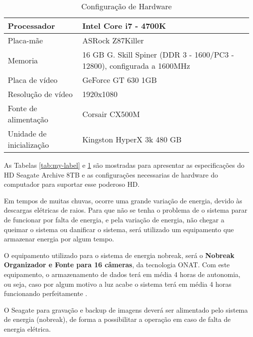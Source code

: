 \begin{table}[htp]
\centering
\caption{Configuração de Hardware}
\begin{tabular}{|p{5cm}|p{10cm}|}
\hline
Processador              & Intel Core i7 - 4700K                                                   \\ \hline
Placa-mãe                & ASRock Z87Killer                                                        \\ \hline
Memoria                  & 16 GB G. Skill Spiner (DDR 3 - 1600/PC3 - 12800), configurada a 1600MHz \\ \hline
Placa de vídeo           & GeForce GT 630 1GB                                                      \\ \hline
Resolução de vídeo       & 1920x1080                                                               \\ \hline
Fonte de alimentação     & Corsair CX500M                                                          \\ \hline
Unidade de inicialização & Kingston HyperX 3k 480 GB                                               \\ \hline
\end{tabular}
\label{tab:configHardware}
\end{table}

As Tabelas \ref{tab:my-label} e \ref{tab:configHardware} são mostradas para apresentar as especificações do HD Seagate Archive 8TB e as configurações necessarias de hardware do computador para suportar esse poderoso HD.

Em tempos de muitas chuvas, ocorre uma grande variação de energia, devido às descargas
elétricas de raios. Para que não se tenha o problema de o sistema parar de funcionar por falta de
energia, e pela variação de energia, não chegar a queimar o sistema ou danificar o sistema,
será utilizado um equipamento que armazenar energia por algum tempo.

O equipamento utilizado para o sistema de energia nobreak, será o \textbf{Nobreak Organizador e
Fonte para 16 câmeras}, da tecnologia ONAT. Com este equipamento, o armazenamento de
dados terá em média 4 horas de autonomia, ou seja, caso por algum motivo a luz acabe o
sistema terá em média 4 horas funcionando perfeitamente \cite{nobreak}.

O Seagate para gravação e backup de imagens deverá ser alimentado pelo sistema de energia
(nobreak), de forma a possibilitar a operação em caso de falta de energia elétrica.

